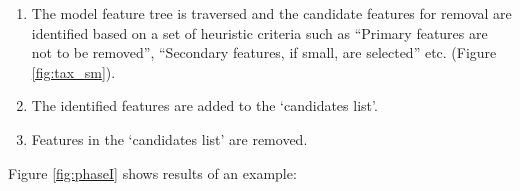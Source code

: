 \begin{enumerate}
[noitemsep,topsep=2pt,parsep=2pt,partopsep=2pt]

\item The model feature tree is traversed and the candidate features for removal are identified based on a set of heuristic criteria such as ``Primary features are not to be removed'', ``Secondary features, if small, are selected'' etc.  (Figure \ref{fig:tax_sm}).
\item The identified features are added to the `candidates list'.
\item Features in the `candidates list' are removed.
\end{enumerate}

Figure \ref{fig:phaseI} shows results of an example:

